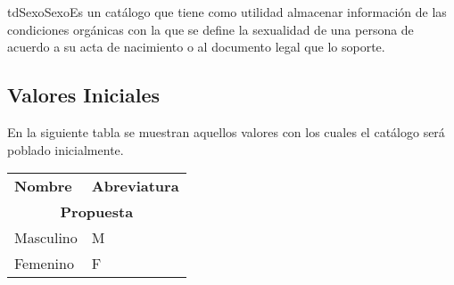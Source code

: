 	\begin{TipoDeDato}{tdSexo}{Sexo}{Es un catálogo que tiene como utilidad almacenar información de las condiciones orgánicas con la que se define la sexualidad de una persona de acuerdo a su acta de nacimiento o al documento legal que lo soporte.}
	
	\begin{tdAtributos}
				
	\end{tdAtributos}
	
	\subsection{Valores Iniciales}
		 En la siguiente tabla se muestran aquellos valores con los cuales el catálogo será poblado inicialmente.\cdtEmpty
	 		\begin{longtable}{| p{}| p{}|}
	 			\rowcolor{colorPrincipal}
	 			\multicolumn{2}{|c|}{\bf \color{white} Valores Iniciales}\\
	 			\hline
	 			\rowcolor{colorSecundario}
	 			\bf \color{white} Nombre & \bf \color{white} Abreviatura \\
	 			\hline
	 			\multicolumn{2}{|c|}{\bf \color{colorPrincipal}Propuesta}\\
	 			\hline
	 			Masculino & M\\
	 			\hline
	 			Femenino & F \\
	 			\hline
	 		\end{longtable}
	\end{TipoDeDato}
	

